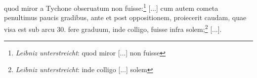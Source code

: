 \pend \pstart [p.~186] [...] quod miror a Tychone\protect{} obseruatum non fuisse:\footnote{\textit{Leibniz unterstreicht}: quod miror [...] non fuisse} [...] cum autem cometa\protect{} penultimus paucis  gradibus, ante et post oppositionem, proiecerit caudam\protect{},  quae visa est sub arcu 30. fere graduum, inde colligo,  fuisse infra solem;\footnote{\textit{Leibniz unterstreicht}: inde colligo [...] solem} [...].